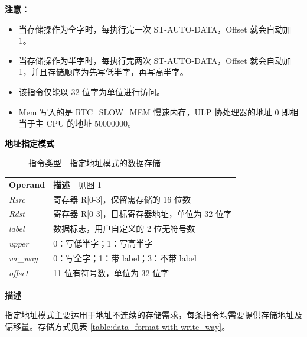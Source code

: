 \documentclass[main\_\_CN.tex]{subfiles}
\begin{document}
\textbf{注意：}
\begin{itemize}
    \item 当存储操作为全字时，每执行完一次 ST-AUTO-DATA，Offset 就会自动加 1。
    \item 当存储操作为半字时，每执行完两次 ST-AUTO-DATA，Offset 就会自动加 1，并且存储顺序为先写低半字，再写高半字。
    \item 该指令仅能以 32 位字为单位进行访问。
    \item Mem 写入的是 RTC\_SLOW\_MEM 慢速内存，ULP 协处理器的地址 0 即相当于主 CPU 的地址 \hexprefix{}50000000。
\end{itemize}

\textcolor{black}{\bfseries 地址指定模式}

%
%
%
%
%
%
%
%
%
%
\begin{figure}[!ht]
    \centering
    \caption{指令类型 - 指定地址模式的数据存储}
    \label{figure:STM}
\end{figure}


\begin{tabular}{ l l }
\textbf{Operand} & \textbf{描述} - 见图 \ref{figure:STM} \\
\textit{Rsrc} & 寄存器 R[0-3]，保留需存储的 16 位数 \\
\textit{Rdst} & 寄存器 R[0-3]，目标寄存器地址，单位为 32 位字\\
\textit{label} & 数据标志，用户自定义的 2 位无符号数\\
\textit{upper} & 0：写低半字；1：写高半字 \\
\textit{wr\_way} & 0：写全字；1：带 label；3：不带 label \\
\textit{offset} & 11 位有符号数，单位为 32 位字\\
\end{tabular}

\textbf{描述}

指定地址模式主要运用于地址不连续的存储需求，每条指令均需要提供存储地址及偏移量。存储方式见表 \ref{table:data_format-with-write_way}。\\
\end{document}
